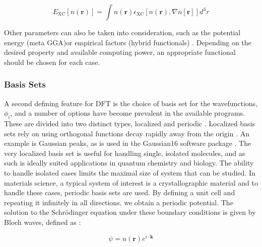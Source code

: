 \begin{equation}
E_{\mathrm{XC}}[n(\textbf{r})] = \int  n(\textbf{r}) \epsilon_{\mathrm{XC}}[n(\textbf{r}), \nabla n[\textbf{r}]] d^3r
\end{equation}


Other parameters can also be taken into consideration, such as the potential energy (meta GGA)or empirical factors (hybrid functionals) \cite{tao_climbing_2003, bj_pot}.  Depending on the desired property and available computing power, an appropriate functional should be chosen for each case.


\subsubsection{Basis Sets}
A second defining feature for DFT is the choice of basis set for the wavefunctions, $\phi_i$, and a number of options have become prevalent in the available programs.  These are divided into two distinct types, localized and periodic \cite{sholl_density_2009}.  Localized basis sets rely on using orthogonal functions decay rapidly away from the origin \cite{sholl_density_2009}.  An example is Gaussian peaks, as is used in the Gaussian16 software package \cite{g16}.  The very localized basis set is useful for handling single, isolated molecules, and as such is ideally suited applications in quantum chemistry and biology. The ability to handle isolated cases limits the maximal size of system that can be studied.  In materials science, a typical system of interest is a crystallographic material and to handle these cases, periodic basis sets are used.  By defining a unit cell and repeating it infinitely in all directions, we obtain a periodic potential.  The solution to the Schr\"odinger equation under these boundary conditions is given by Bloch waves, defined as \cite{griffiths}:

\begin{equation}
	\psi = u(\textbf{r}) e^{i\cdot \textbf{k}}
\end{equation}

